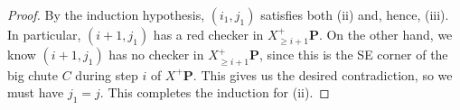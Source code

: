 \documentclass[10pt,a4paper]{amsart}
\newcommand{\bfP}{\mathbf{P}}
\begin{document}
\begin{proof}
By the induction hypothesis, $(i_1,j_1)$ satisfies both (ii) and, hence, (iii).
In particular, $(i+1,j_1)$ has a red checker in $X^+_{\geq i+1}\bfP$.
On the other hand, we know $(i+1,j_1)$ has no checker in $X^+_{\geq i+1}\bfP$, since this is the SE corner of the big chute $C$ during step $i$ of $X^+\bfP$.
This gives us the desired contradiction, so we must have $j_1=j$.
This completes the induction for (ii).
\end{proof}
\end{document}

